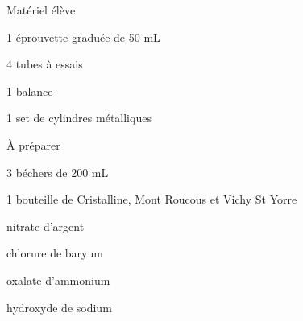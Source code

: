 
\begin{boiteMateriel}{Matériel élève}
  \effectifSeconde
  
  \begin{protocole}[2]
    \item 1 éprouvette graduée de 50 mL
    \item 4 tubes à essais
    \item 1 balance
    \item 1 set de cylindres métalliques
  \end{protocole}
\end{boiteMateriel}


\begin{boiteMateriel}{À préparer}
  \vspace*{4pt}
  \begin{protocole}[2]
    \item 3 béchers de 200 mL
    \item 1 bouteille de Cristalline, Mont Roucous et Vichy St Yorre
    \item nitrate d'argent
    \item chlorure de baryum
    \item oxalate d'ammonium
    \item hydroxyde de sodium
  \end{protocole}
\end{boiteMateriel}